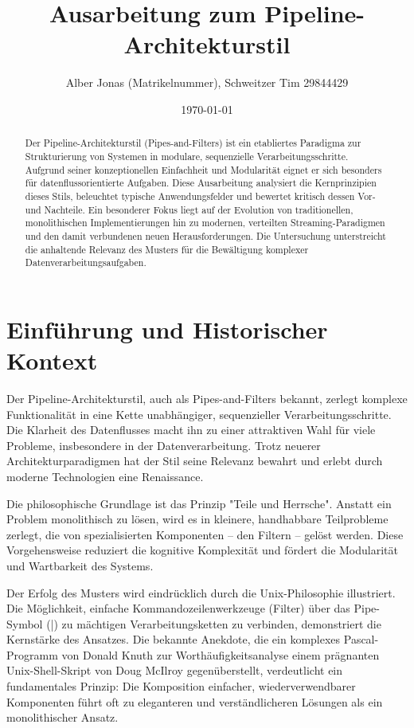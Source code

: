 \documentclass[10pt,a4paper]{article}
\title{Ausarbeitung zum Pipeline-Architekturstil}
\author{Alber Jonas (Matrikelnummer), Schweitzer Tim 29844429}
\date{\today}
\begin{document}
\maketitle

\begin{abstract}
\noindent %
Der Pipeline-Architekturstil (Pipes-and-Filters) ist ein etabliertes Paradigma zur Strukturierung von Systemen in modulare, sequenzielle Verarbeitungsschritte. Aufgrund seiner konzeptionellen Einfachheit und Modularität eignet er sich besonders für datenflussorientierte Aufgaben.\cite{richards2020} Diese Ausarbeitung analysiert die Kernprinzipien dieses Stils, beleuchtet typische Anwendungsfelder und bewertet kritisch dessen Vor- und Nachteile. Ein besonderer Fokus liegt auf der Evolution von traditionellen, monolithischen Implementierungen hin zu modernen, verteilten Streaming-Paradigmen und den damit verbundenen neuen Herausforderungen. Die Untersuchung unterstreicht die anhaltende Relevanz des Musters für die Bewältigung komplexer Datenverarbeitungsaufgaben.
\end{abstract}

\section{Einführung und Historischer Kontext}
Der Pipeline-Architekturstil, auch als Pipes-and-Filters bekannt, zerlegt komplexe Funktionalität in eine Kette unabhängiger, sequenzieller Verarbeitungsschritte. Die Klarheit des Datenflusses macht ihn zu einer attraktiven Wahl für viele Probleme, insbesondere in der Datenverarbeitung. Trotz neuerer Architekturparadigmen hat der Stil seine Relevanz bewahrt und erlebt durch moderne Technologien eine Renaissance.

Die philosophische Grundlage ist das Prinzip "Teile und Herrsche". Anstatt ein Problem monolithisch zu lösen, wird es in kleinere, handhabbare Teilprobleme zerlegt, die von spezialisierten Komponenten – den Filtern – gelöst werden. Diese Vorgehensweise reduziert die kognitive Komplexität und fördert die Modularität und Wartbarkeit des Systems.\cite{richards2020}

Der Erfolg des Musters wird eindrücklich durch die Unix-Philosophie illustriert. Die Möglichkeit, einfache Kommandozeilenwerkzeuge (Filter) über das Pipe-Symbol (|) zu mächtigen Verarbeitungsketten zu verbinden, demonstriert die Kernstärke des Ansatzes.\cite{richards2020, uqcloud_pipeline} Die bekannte Anekdote, die ein komplexes Pascal-Programm von Donald Knuth zur Worthäufigkeitsanalyse einem prägnanten Unix-Shell-Skript von Doug McIlroy gegenüberstellt, verdeutlicht ein fundamentales Prinzip: Die Komposition einfacher, wiederverwendbarer Komponenten führt oft zu eleganteren und verständlicheren Lösungen als ein monolithischer Ansatz.\cite{richards2020}
\end{document}
